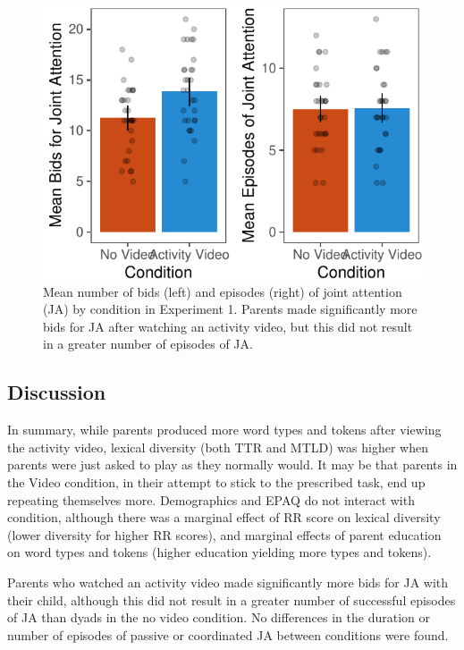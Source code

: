 \documentclass[man,floatsintext]{apa6}
\begin{document}
\begin{figure}
\centering
\includegraphics{figs/e1ja-1.pdf}
\caption{\label{fig:e1ja}Mean number of bids (left) and episodes (right) of joint attention (JA) by condition in Experiment 1. Parents made significantly more bids for JA after watching an activity video, but this did not result in a greater number of episodes of JA.}
\end{figure}

\hypertarget{discussion}{%
\subsection{Discussion}\label{discussion}}

In summary, while parents produced more word types and tokens after viewing the activity video, lexical diversity (both TTR and MTLD) was higher when parents were just asked to play as they normally would.
It may be that parents in the Video condition, in their attempt to stick to the prescribed task, end up repeating themselves more.
Demographics and EPAQ do not interact with condition, although there was a marginal effect of RR score on lexical diversity (lower diversity for higher RR scores), and marginal effects of parent education on word types and tokens (higher education yielding more types and tokens).

Parents who watched an activity video made significantly more bids for JA with their child, although this did not result in a greater number of successful episodes of JA than dyads in the no video condition.
No differences in the duration or number of episodes of passive or coordinated JA between conditions were found.
\end{document}
